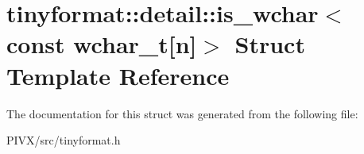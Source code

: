 \hypertarget{structtinyformat_1_1detail_1_1is__wchar_3_01const_01wchar__t[n]_4}{}\section{tinyformat\+:\+:detail\+:\+:is\+\_\+wchar$<$ const wchar\+\_\+t\mbox{[}n\mbox{]}$>$ Struct Template Reference}
\label{structtinyformat_1_1detail_1_1is__wchar_3_01const_01wchar__t[n]_4}


The documentation for this struct was generated from the following file\+:\begin{DoxyCompactItemize}
\item 
P\+I\+V\+X/src/tinyformat.\+h\end{DoxyCompactItemize}
